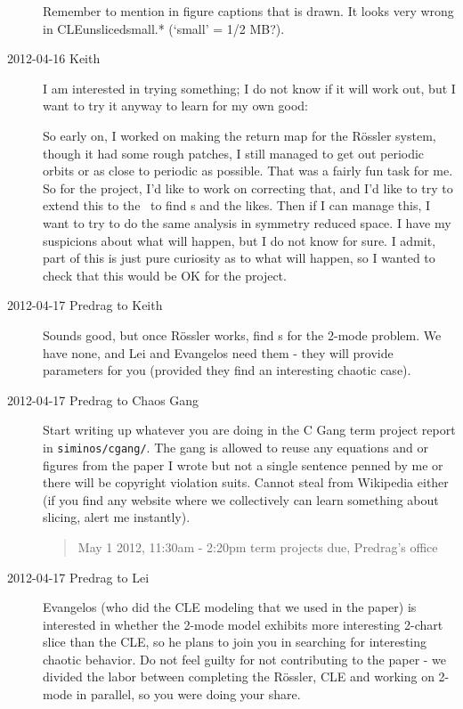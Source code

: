 \begin{description}
Remember to mention in figure captions that  is drawn. It looks
very wrong in CLEunslicedsmall.* (`small' = 1/2 MB?).


\item[2012-04-16 Keith]
I am interested in trying something; I do not know if it will work out,
but I want to try it anyway to learn for my own good:

So early on, I worked on making the return map for the R\"ossler system,
though it had some rough patches, I still managed to get out periodic
orbits or as close to periodic as possible.  That was a fairly fun task
for me.  So for the project, I'd like to work on correcting that, and I'd
like to try to extend this to the \cLf\ to find \rpo s and the
likes.  Then if I can manage this, I want to try to do the same analysis
in symmetry reduced space.  I have my suspicions about what will happen,
but I do not know for sure.  I admit, part of this is just pure curiosity
as to what will happen, so I wanted to check that this would be OK for
the project.

\item[2012-04-17 Predrag to Keith] Sounds good, but once R\"ossler works,
find \rpo s for the 2-mode problem. We have none, and Lei and Evangelos
need them - they will provide parameters for you (provided they find an
interesting chaotic case).

\item[2012-04-17 Predrag to Chaos Gang]
Start writing up whatever you are doing in the C Gang term project report
in \texttt{siminos/cgang/}. The gang is allowed to reuse any equations
and or figures from the paper I wrote but not a single
sentence penned by me or there will be copyright violation suits. Cannot
steal from Wikipedia either (if you find any website where we
collectively can learn something about slicing, alert me instantly).

\begin{quote}
{\color{red} \large
May 1 2012,  11:30am - 2:20pm term projects due, Predrag's office
}
\end{quote}


\item[2012-04-17 Predrag to Lei] Evangelos (who did the CLE modeling that
we used in the paper) is interested in whether the 2-mode model exhibits
more interesting 2-chart slice than the CLE, so he plans to join you in
searching for interesting chaotic behavior. Do not feel guilty for not
contributing to the paper - we divided the labor between completing the
R\"ossler, CLE and working on 2-mode in parallel, so you were doing your
share.


\end{description}
